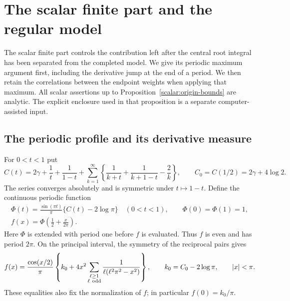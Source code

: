 \section{The scalar finite part and the regular model}
\label{scalar:appendix}\label{app:scalar-estimates}

The scalar finite part controls the contribution left after the central
root integral has been separated from the completed model.  We give its
periodic maximum argument first, including the derivative jump at the
end of a period.  We then retain the correlations between the endpoint
weights when applying that maximum.  All scalar assertions up to
Proposition~\ref{scalar:origin-bounds} are analytic.  The explicit
enclosure used in that proposition is a separate computer-assisted
input.

\subsection{The periodic profile and its derivative measure}

For $0<t<1$ put
\begin{equation}\label{scalar:C-definition}
 C(t)=2\gamma+\frac1t+\frac1{1-t}
 +\sum_{k=1}^{\infty}
 \left\{\frac1{k+t}+\frac1{k+1-t}-\frac2k\right\},
 \qquad C_0=C(1/2)=2\gamma+4\log2.
\end{equation}
The series converges absolutely and is symmetric under $t\mapsto1-t$.
Define the continuous periodic function
\begin{equation}\label{scalar:f-definition}
 \begin{gathered}
 \Phi(t)=\frac{\sin(\pi t)}\pi\{C(t)-2\log\pi\}
 \quad(0<t<1),\qquad \Phi(0)=\Phi(1)=1,\\
 f(x)=\Phi\left(\frac12+\frac{x}{2\pi}\right).
 \end{gathered}
\end{equation}
Here $\Phi$ is extended with period one before $f$ is evaluated.  Thus
$f$ is even and has period $2\pi$.  On the principal interval, the
symmetry of the reciprocal pairs gives
\begin{equation}\label{scalar:f-series}
 f(x)=\frac{\cos(x/2)}\pi
 \left\{k_0+4x^2\sum_{\substack{\ell\geq1\\\ell\ {\rm odd}}}
       \frac1{\ell(\ell^2\pi^2-x^2)}\right\},
 \qquad k_0=C_0-2\log\pi,\qquad |x|<\pi.
\end{equation}
These equalities also fix the normalization of $f$; in particular
$f(0)=k_0/\pi$.

